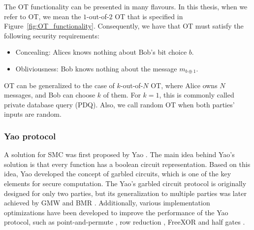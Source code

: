 The OT functionality can be presented in many flavours. In this thesis, when we refer to OT, we mean the $1$-out-of-$2$ OT that is specified in Figure~\ref{fig:OT_functionality}. Consequently, we have that OT must satisfy the following security requirements:

\begin{itemize}
	\item Concealing: Alices knows nothing about Bob's bit choice $b$.
	\item Obliviousness: Bob knows nothing about the message $m_{b\oplus 1}$.
\end{itemize}

OT can be generalized to the case of $k$-out-of-$N$ OT, where Alice owns $N$ messages, and Bob can choose $k$ of them. For $k=1$, this is commonly called private database query (PDQ). Also, we call random OT when both parties' inputs are random.


\subsubsection{Yao protocol}\label{yaoProtocol}

A solution for SMC was first proposed by Yao \cite{Yao82}. The main idea behind Yao's solution is that every function has a boolean circuit representation. Based on this idea, Yao developed the concept of garbled circuits, which is one of the key elements for secure computation. The Yao's garbled circuit protocol is originally designed for only two parties, but its generalization to multiple parties was later achieved by GMW \cite{Goldreich87} and BMR \cite{BMR90}. Additionally, various implementation optimizations have been developed to improve the performance of the Yao protocol, such as point-and-permute \cite{BMR90}, row reduction \cite{NPS99, Pinkas2009}, FreeXOR \cite{Kolesnikov2005} and half gates \cite{Zahur2015}.

